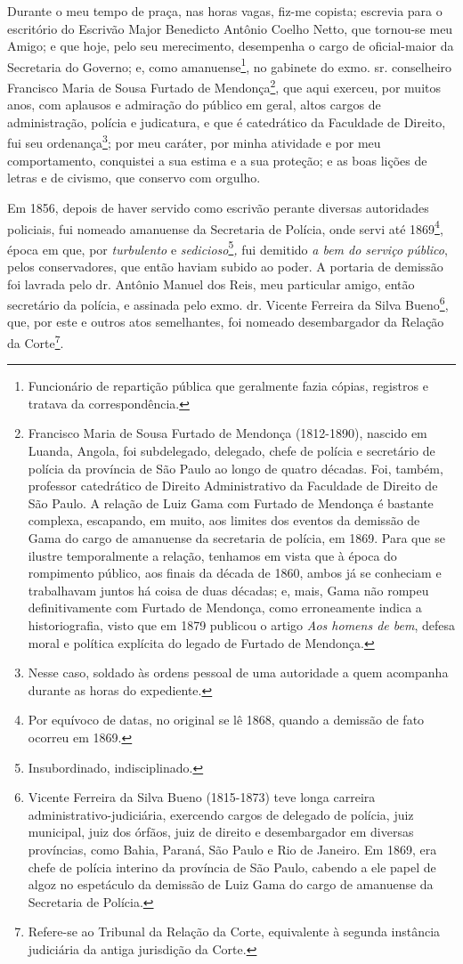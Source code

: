 Durante o meu tempo de praça, nas horas vagas, fiz-me copista; escrevia
para o escritório do Escrivão Major Benedicto Antônio Coelho Netto, que
tornou-se meu Amigo; e que hoje, pelo seu merecimento, desempenha o
cargo de oficial-maior da Secretaria do Governo; e, como
amanuense\footnote{Funcionário de repartição pública que geralmente
  fazia cópias, registros e tratava da correspondência.}, no gabinete do
exmo. sr. conselheiro Francisco Maria de Sousa Furtado de
Mendonça\footnote{Francisco Maria de Sousa Furtado de Mendonça
  (1812-1890), nascido em Luanda, Angola, foi subdelegado, delegado,
  chefe de polícia e secretário de polícia da província de São Paulo ao
  longo de quatro décadas. Foi, também, professor catedrático de Direito
  Administrativo da Faculdade de Direito de São Paulo. A relação de Luiz
  Gama com Furtado de Mendonça é bastante complexa, escapando, em muito,
  aos limites dos eventos da demissão de Gama do cargo de amanuense da
  secretaria de polícia, em 1869. Para que se ilustre temporalmente a
  relação, tenhamos em vista que à época do rompimento público, aos
  finais da década de 1860, ambos já se conheciam e trabalhavam juntos
  há coisa de duas décadas; e, mais, Gama não rompeu definitivamente com
  Furtado de Mendonça, como erroneamente indica a historiografia, visto
  que em 1879 publicou o artigo \emph{Aos homens de bem}, defesa moral e
  política explícita do legado de Furtado de Mendonça.}, que aqui
exerceu, por muitos anos, com aplausos e admiração do público em geral,
altos cargos de administração, polícia e judicatura, e que é catedrático
da Faculdade de Direito, fui seu ordenança\footnote{Nesse caso,
  soldado às ordens pessoal de uma autoridade a quem acompanha durante
  as horas do expediente.}; por meu caráter, por minha atividade e por
meu comportamento, conquistei a sua estima e a sua proteção; e as boas
lições de letras e de civismo, que conservo com orgulho.

Em 1856, depois de haver servido como escrivão perante diversas
autoridades policiais, fui nomeado amanuense da Secretaria de Polícia,
onde servi até 1869\footnote{Por equívoco de datas, no original se lê
  1868, quando a demissão de fato ocorreu em 1869.}, época em que, por
\emph{turbulento} e \emph{sedicioso}\footnote{Insubordinado,
  indisciplinado.}\emph{,} fui demitido \emph{a bem do serviço público},
pelos conservadores, que então haviam subido ao poder. A portaria de
demissão foi lavrada pelo dr. Antônio Manuel dos Reis, meu particular
amigo, então secretário da polícia, e assinada pelo exmo. dr. Vicente
Ferreira da Silva Bueno\footnote{Vicente Ferreira da Silva Bueno
  (1815-1873) teve longa carreira administrativo-judiciária, exercendo
  cargos de delegado de polícia, juiz municipal, juiz dos órfãos, juiz
  de direito e desembargador em diversas províncias, como Bahia, Paraná,
  São Paulo e Rio de Janeiro. Em 1869, era chefe de polícia interino da
  província de São Paulo, cabendo a ele papel de algoz no espetáculo da
  demissão de Luiz Gama do cargo de amanuense da Secretaria de Polícia.},
que, por este e outros atos semelhantes, foi nomeado desembargador da
Relação da Corte\footnote{Refere-se ao Tribunal da Relação da Corte,
  equivalente à segunda instância judiciária da antiga jurisdição da
  Corte.}.

